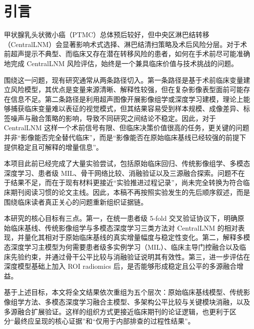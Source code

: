 \section{引言}

甲状腺乳头状微小癌（PTMC）总体预后较好，但中央区淋巴结转移（CentralLNM）会显著影响术式选择、淋巴结清扫策略及术后风险分层。对于术前超声提示不典型、而临床又存在潜在转移风险的患者，如何在手术前尽可能准确地完成 CentralLNM 风险评估，始终是一个兼具临床价值与技术挑战的问题。

围绕这一问题，现有研究通常从两条路径切入。第一条路径是基于术前临床变量建立风险模型，其优点是变量来源清晰、解释性较强，但在复杂影像表型面前可能存在信息不足。第二条路径是利用超声图像开展影像组学或深度学习建模，理论上能够捕获临床变量难以表征的视觉模式，但其结果容易受到样本规模、成像差异、标签噪声与融合策略的影响，导致不同研究之间结论不稳定。因此，对于 CentralLNM 这样一个术前信号有限、但临床决策价值很高的任务，更关键的问题并非“影像能否完全替代临床”，而是“影像能否在原始临床基线已经较强的前提下提供稳定且可解释的增量信息”。

本项目此前已经完成了大量实验尝试，包括原始临床回归、传统影像组学、多模态深度学习、患者级 MIL、骨干网络比较、消融验证以及三源融合探索。问题不在于结果不足，而在于现有材料更接近“实验推进过程记录”，尚未完全转换为符合临床期刊阅读习惯的论文主线。因此，本稿不再按照实验发生的先后顺序叙述，而是围绕临床读者真正关心的问题重新组织证据链。

本研究的核心目标有三点。第一，在统一患者级 5-fold 交叉验证协议下，明确原始临床基线、传统影像组学与多模态深度学习三类方法对 CentralLNM 的相对表现，并量化其相对于原始临床基线的真实增量幅度与稳定性变化。第二，解释多模态深度学习主模型为何需要患者级多实例学习（MIL）、临床主导门控融合以及临床先验约束，并通过骨干公平比较与消融验证说明其有效性。第三，进一步评估在深度模型基础上加入 ROI radiomics 后，是否能够形成稳定且公平的多源融合增益。

基于上述目标，本文将全文结果依次重组为五个层次：原始临床基线模型、传统影像组学方法、多模态深度学习融合主模型、多架构公平比较与关键模块消融，以及多源融合扩展验证。这样的组织方式更接近临床期刊的论证逻辑，也更利于区分“最终应呈现的核心证据”和“仅用于内部排查的过程性结果”。
